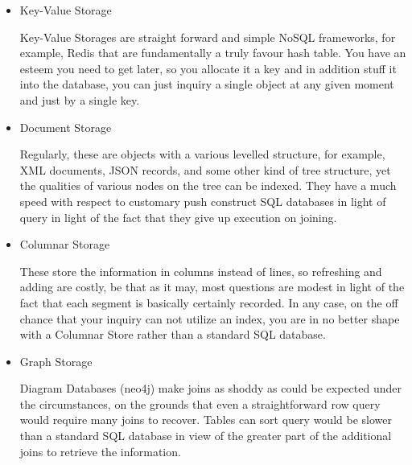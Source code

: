 \begin{itemize}
\item Key-Value Storage \par
Key-Value Storages are straight forward and simple NoSQL frameworks, for example, Redis that are fundamentally a truly favour hash table. You have an esteem you need to get later, so you allocate it a key and in addition stuff it into the database, you can just inquiry a single object at any given moment and just by a single key.

\item Document Storage \par
Regularly, these are objects with a various levelled structure, for example, XML documents, JSON records, and some other kind of tree structure, yet the qualities of various nodes on the tree can be indexed. They have a much speed with respect to customary push construct SQL databases in light of query in light of the fact that they give up execution on joining. 

\item Columnar Storage  \par
These store the information in columns instead of lines, so refreshing and adding are costly, be that as it may, most questions are modest in light of the fact that each segment is basically certainly recorded. In any case, on the off chance that your inquiry can not utilize an index, you are in no better shape with a Columnar Store rather than a standard SQL database.

\item Graph Storage  \par
Diagram Databases (neo4j) make joins as shoddy as could be expected under the circumstances, on the grounds that even a straightforward row query would require many joins to recover. Tables can sort query would be slower than a standard SQL database in view of the greater part of the additional joins to retrieve the information. \cite{DataTypes}
\end{itemize}

